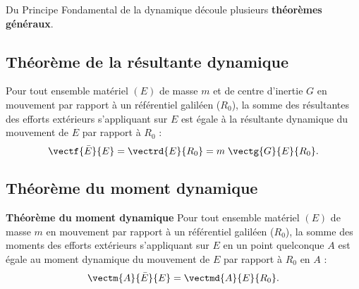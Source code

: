 Du Principe Fondamental de la dynamique découle plusieurs \textbf{théorèmes généraux}.

\subsection{Théorème de la résultante dynamique}

\begin{theoreme}
Pour tout ensemble matériel $(E)$ de masse $m$ et de centre d'inertie $G$ en mouvement par rapport à un référentiel galiléen ($R_0$), la somme des résultantes des efforts extérieurs s'appliquant sur $E$ est égale à la résultante dynamique du mouvement de $E$ par rapport à $R_0$ :
$$
\vectf{\bar E}{E}=\vectrd{E}{R_0}=m\;\vectg{G}{E}{R_0}.
$$
\end{theoreme}



\subsection{Théorème du moment dynamique}
\begin{theoreme}\textbf{Théorème du moment dynamique}
			Pour tout ensemble matériel $(E)$ de masse $m$ en mouvement par rapport à un référentiel galiléen ($R_0$), la somme des moments des efforts extérieurs s'appliquant sur $E$ en un point quelconque $A$ est égale au moment dynamique du mouvement de $E$ par rapport à $R_0$ en $A$ :
			$$
				\vectm{A}{\bar E}{E}=\vectmd{A}{E}{R_0}.
			$$
		\end{theoreme}

%
%
%

